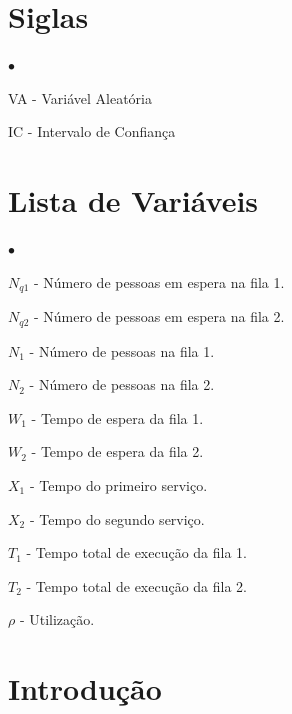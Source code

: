 \documentclass[a4paper,12pt]{report}
\begin{document}



\begin{abstract}
\end{abstract}

\chapter*{Siglas}
\begin{list}{$\bullet$}{}
  \item[VA] - Variável Aleatória
  \item[IC] - Intervalo de Confiança
\end{list}

\chapter*{Lista de Variáveis}
\begin{list}{$\bullet$}{}
  \item[$N_{q1}$] - Número de pessoas em espera na fila 1.
  \item[$N_{q2}$] - Número de pessoas em espera na fila 2.
  \item[$N_1$] - Número de pessoas na fila 1.
  \item[$N_2$] - Número de pessoas na fila 2.
  \item[$W_1$] - Tempo de espera da fila 1.
  \item[$W_2$] - Tempo de espera da fila 2.
  \item[$X_1$] - Tempo do primeiro serviço.
  \item[$X_2$] - Tempo do segundo serviço.
  \item[$T_1$] - Tempo total de execução da fila 1.
  \item[$T_2$] - Tempo total de execução da fila 2.
  \item[$\rho$] - Utilização.
\end{list}

\tableofcontents

\listoffigures

\listoftables

\chapter{Introdução}
\end{document}

